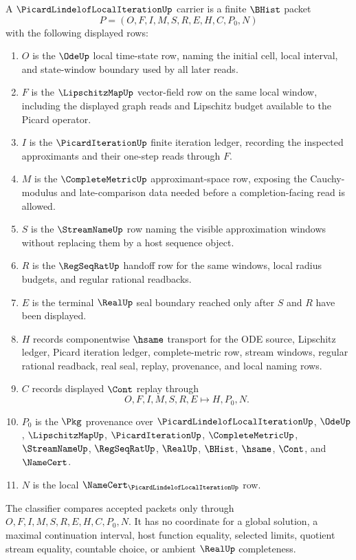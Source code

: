 \begin{definition}
\label{def:picard-lindelof-local-iteration-carrier}
A $\PicardLindelofLocalIterationUp$ carrier is a finite $\BHist$ packet
$$
P=(O,F,I,M,S,R,E,H,C,P_0,N)
$$
with the following displayed rows:
\begin{enumerate}
\item $O$ is the $\OdeUp$ local time-state row, naming the initial cell, local interval, and state-window boundary used by all later reads.
\item $F$ is the $\LipschitzMapUp$ vector-field row on the same local window, including the displayed graph reads and Lipschitz budget available to the Picard operator.
\item $I$ is the $\PicardIterationUp$ finite iteration ledger, recording the inspected approximants and their one-step reads through $F$.
\item $M$ is the $\CompleteMetricUp$ approximant-space row, exposing the Cauchy-modulus and late-comparison data needed before a completion-facing read is allowed.
\item $S$ is the $\StreamNameUp$ row naming the visible approximation windows without replacing them by a host sequence object.
\item $R$ is the $\RegSeqRatUp$ handoff row for the same windows, local radius budgets, and regular rational readbacks.
\item $E$ is the terminal $\RealUp$ seal boundary reached only after $S$ and $R$ have been displayed.
\item $H$ records componentwise $\hsame$ transport for the ODE source, Lipschitz ledger, Picard iteration ledger, complete-metric row, stream windows, regular rational readback, real seal, replay, provenance, and local naming rows.
\item $C$ records displayed $\Cont$ replay through
$$
O,F,I,M,S,R,E \longmapsto H,P_0,N .
$$
\item $P_0$ is the $\Pkg$ provenance over $\PicardLindelofLocalIterationUp$, $\OdeUp$, $\LipschitzMapUp$, $\PicardIterationUp$, $\CompleteMetricUp$, $\StreamNameUp$, $\RegSeqRatUp$, $\RealUp$, $\BHist$, $\hsame$, $\Cont$, and $\NameCert$.
\item $N$ is the local $\NameCert_{\PicardLindelofLocalIterationUp}$ row.
\end{enumerate}
The classifier compares accepted packets only through $O,F,I,M,S,R,E,H,C,P_0,N$. It has no coordinate for a global solution, a maximal continuation interval, host function equality, selected limits, quotient stream equality, countable choice, or ambient $\RealUp$ completeness.
\end{definition}

